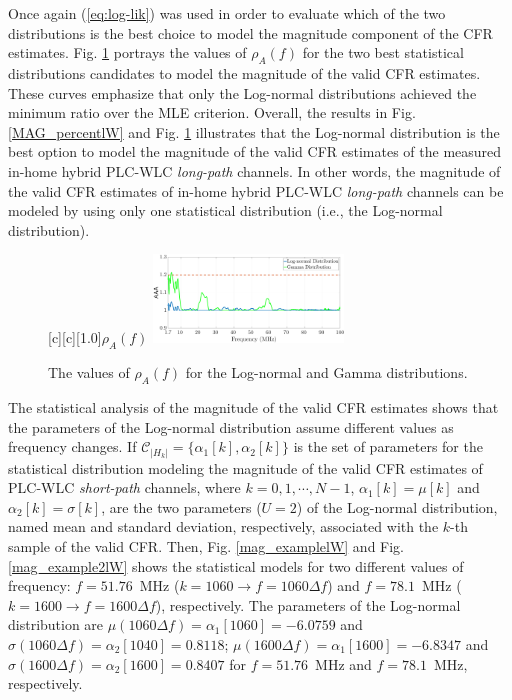 \documentclass[journal]{IEEEtran}
\begin{document}
Once again (\ref{eq:log-lik}) was used in order to evaluate which of the two distributions is the best choice to model the magnitude component of the \ac{CFR} estimates. Fig. \ref{fig:Log_likelW} portrays the values of  $\rho_{A}(f)$ for the two best statistical distributions candidates to model the magnitude of the valid \ac{CFR} estimates. These curves emphasize that only the Log-normal distributions achieved the minimum ratio over the \ac{MLE} criterion. Overall, the results in Fig. \ref{MAG_percentlW} and Fig. \ref{fig:Log_likelW} illustrates that the Log-normal distribution is the best option to model the magnitude of the valid \ac{CFR} estimates of the measured in-home hybrid \ac{PLC}-\ac{WLC} \textit{long-path} channels. In other words, the magnitude of the valid \ac{CFR} estimates of in-home hybrid \ac{PLC}-\ac{WLC} \textit{long-path} channels can be modeled by using only one statistical distribution (i.e., the Log-normal distribution).

\begin{figure}[h!]
	\centering
	[c][1.0]{$\rho_{A} (f)$}
	\includegraphics[width=0.45\textwidth]{images/Log_Lognormal_GammalW.eps}
	\caption{The values of $\rho_{A} (f)$ for the Log-normal and Gamma distributions.}
	\label{fig:Log_likelW}
\end{figure}

The statistical analysis of the magnitude of the valid \ac{CFR} estimates shows that the parameters of the Log-normal distribution assume different values as frequency changes. If $\mathcal{C}_{|H_k|} = \{\alpha_1[k],\alpha_2[k]\}$ is the set of parameters for the statistical distribution modeling the magnitude of the valid \ac{CFR} estimates of \ac{PLC}-\ac{WLC} \textit{short-path} channels, where $k=0,1,\cdots,N-1$,  $\alpha_1[k] = \mu[k]$ and $\alpha_2[k] = \sigma[k]$, are the two parameters ($U=2$) of the Log-normal distribution, named mean and standard deviation, respectively, associated with the $k$-th sample of the valid \ac{CFR}. Then, Fig. \ref{mag_examplelW} and Fig. \ref{mag_example2lW} shows the statistical models for two different values of frequency: $f=51.76$~MHz ($k=1060 \rightarrow f = 1060\Delta f$) and $f=78.1$~MHz ($k=1600 \rightarrow f = 1600\Delta f$), respectively. The parameters of the Log-normal distribution are  $\mu(1060 \Delta f) = \alpha_1[1060]=-6.0759$ and $\sigma( 1060 \Delta f) = \alpha_2[1040] = 0.8118$; $\mu(1600 \Delta f) = \alpha_1[1600] = -6.8347$ and $\sigma( 1600 \Delta f) = \alpha_2[1600]=0.8407$ for $f=51.76$~MHz and $f=78.1$~MHz, respectively.
\end{document}
